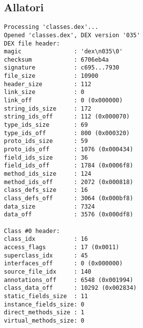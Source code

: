 \subsection{Allatori}
\label{app:da}
\begin{lstlisting}
Processing 'classes.dex'...
Opened 'classes.dex', DEX version '035'
DEX file header:
magic               : 'dex\n035\0'
checksum            : 6706eb4a
signature           : c695...7930
file_size           : 10900
header_size         : 112
link_size           : 0
link_off            : 0 (0x000000)
string_ids_size     : 172
string_ids_off      : 112 (0x000070)
type_ids_size       : 69
type_ids_off        : 800 (0x000320)
proto_ids_size      : 59
proto_ids_off       : 1076 (0x000434)
field_ids_size      : 36
field_ids_off       : 1784 (0x0006f8)
method_ids_size     : 124
method_ids_off      : 2072 (0x000818)
class_defs_size     : 16
class_defs_off      : 3064 (0x000bf8)
data_size           : 7324
data_off            : 3576 (0x000df8)

Class #0 header:
class_idx           : 16
access_flags        : 17 (0x0011)
superclass_idx      : 45
interfaces_off      : 0 (0x000000)
source_file_idx     : 140
annotations_off     : 6548 (0x001994)
class_data_off      : 10292 (0x002834)
static_fields_size  : 11
instance_fields_size: 0
direct_methods_size : 1
virtual_methods_size: 0


\end{lstlisting}
